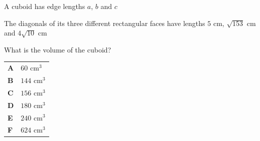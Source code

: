 \documentclass[11pt,a4paper]{article}
\begin{document}
\clearpage
\thispagestyle{djspaper}
\vspace*{8pt}
\begin{enumerate}[label=\textbf{\arabic*.},leftmargin=*,itemsep=0pt,start=15]
\questionitem[Geometry]
A cuboid has edge lengths $a$, $b$ and $c$ 

The diagonals of its three different rectangular faces have lengths $5\text{ cm}$, $\sqrt{153}\text{ cm}$ and $4\sqrt{10}\text{ cm}$

What is the volume of the cuboid?

\par\vspace*{12pt}
\begin{tabularx}{\linewidth}{@{}>{\bfseries}l Y@{}}
A &
$60\text{ cm}^3$
\\[0.8em]
B &
$144\text{ cm}^3$
\\[0.8em]
C &
$156\text{ cm}^3$
\\[0.8em]
D &
$180\text{ cm}^3$
\\[0.8em]
E &
$240\text{ cm}^3$
\\[0.8em]
F &
$624\text{ cm}^3$
\\
\end{tabularx}
\end{enumerate}
\clearpage
\thispagestyle{djspaper}
\vspace*{8pt}
\end{document}
